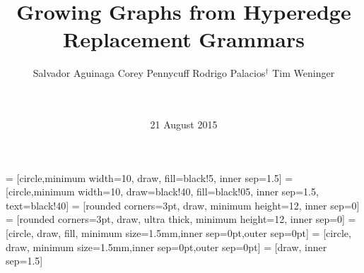 \documentclass{sig-alternate}
\begin{document}
\title{Growing Graphs from Hyperedge Replacement Grammars}


%
\author{
%
%
\alignauthor
Salvador Aguinaga \hspace{.5cm} Corey Pennycuff \hspace{.5cm} Rodrigo Palacios$^\dag$ \hspace{.5cm} Tim Weninger\\
       \\
       \\
}
\date{21 August 2015}

\maketitle
\begin{abstract}
\lipsum[1]
\end{abstract}





 = [circle,minimum width=10, draw, fill=black!5, inner sep=1.5]
 = [circle,minimum width=10, draw=black!40, fill=black!05, inner sep=1.5, text=black!40]
 = [rounded corners=3pt, draw, minimum height=12, inner sep=0]
 = [rounded corners=3pt, draw, ultra thick, minimum height=12, inner sep=0]
 = [circle, draw, fill, minimum size=1.5mm,inner sep=0pt,outer sep=0pt]
 = [circle, draw, minimum size=1.5mm,inner sep=0pt,outer sep=0pt]
 = [draw, inner sep=1.5]




\clearpage



\balancecolumns
\end{document}
